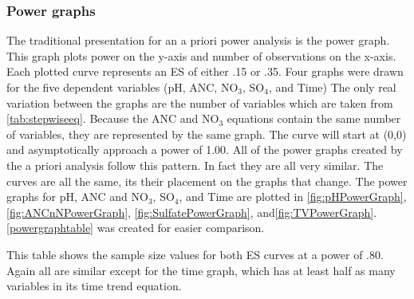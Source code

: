 \subsubsection{Power graphs}
The traditional presentation for an a priori power analysis is the power graph.
This graph plots power on the y-axis and number of observations on the x-axis.
Each plotted curve represents an ES of either .15 or .35.
Four graphs were drawn for the five dependent variables (pH, ANC, NO$_3$, SO$_4$, and Time)
The only real variation between the graphs are the number of variables which are taken from \autoref{tab:stepwiseeq}.
Because the ANC and NO$_3$ equations contain the same number of variables, they are represented by the same graph.
The curve will start at (0,0) and asymptotically approach a power of 1.00.
All of the power graphs created by the a priori analysis follow this pattern.
In fact they are all very similar.
The curves are all the same, its their placement on the graphs that change.
The power graphs for pH, ANC and NO$_3$, SO$_4$, and Time are plotted in \autoref{fig:pHPowerGraph}, \autoref{fig:ANCnNPowerGraph}, \autoref{fig:SulfatePowerGraph}, and\autoref{fig:TVPowerGraph}.
\autoref{powergraphtable} was created for easier comparison.

This table shows the sample size values for both ES curves at a power of .80.
Again all are similar except for the time graph, which has at least half as many variables in its time trend equation.

